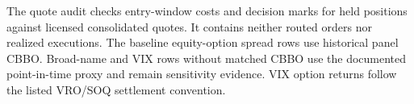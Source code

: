 \documentclass[11pt]{article}
\theoremstyle{definition}
\theoremstyle{remark}
\begin{document}
The quote audit checks entry-window costs and decision marks for held positions against
licensed consolidated quotes. It contains neither routed orders nor realized executions.
The baseline equity-option spread rows use historical panel CBBO. Broad-name and VIX rows
without matched CBBO use the documented point-in-time proxy and remain sensitivity
evidence. VIX option returns follow the listed VRO/SOQ settlement convention.



\end{document}
